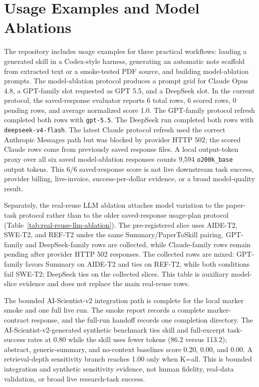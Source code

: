 \section{Usage Examples and Model Ablations}

The repository includes usage examples for three practical workflows:
loading a generated skill in a Codex-style harness, generating an automatic
note scaffold from extracted text or a smoke-tested PDF source, and building
model-ablation prompts. The
model-ablation protocol produces a prompt grid for Claude Opus 4.8, a
GPT-family slot requested as GPT 5.5, and a DeepSeek slot. In the current
protocol, the saved-response evaluator reports 6 total rows, 6 scored rows, 0
pending rows, and average normalized score 1.0. The GPT-family protocol refresh
completed both rows with \texttt{gpt-5.5}. The DeepSeek run completed both rows
with \texttt{deepseek-v4-flash}. The latest Claude protocol refresh used the
correct Anthropic Messages path but was blocked by provider HTTP 502; the
scored Claude rows come from previously saved response files. A local
output-token proxy over all six saved model-ablation responses counts 9,594
\texttt{o200k\_base} output tokens. This 6/6 saved-response score is not live
downstream task success, provider billing, live-invoice, success-per-dollar
evidence, or a broad model-quality result.

Separately, the real-reuse LLM ablation attaches model variation to the
paper-task protocol rather than to the older saved-response usage-plan
protocol (Table~\ref{tab:real-reuse-llm-ablation}). The pre-registered slice
uses AIDE-T2, SWE-T2, and REF-T2 under the same Summary/PaperToSkill pairing.
GPT-family and DeepSeek-family rows are collected, while Claude-family rows
remain pending after provider HTTP 502 responses. The collected rows are mixed:
GPT-family favors Summary on AIDE-T2 and ties on REF-T2, while both conditions
fail SWE-T2; DeepSeek ties on the collected slices. This table is auxiliary
model-slice evidence and does not replace the main real-reuse rows.

The bounded AI-Scientist-v2 integration path is complete for the local marker
smoke and one full live run. The smoke report records a complete marker-contract
response, and the full-run handoff records one completion directory. The
AI-Scientist-v2-generated synthetic benchmark ties skill and full-excerpt
task-success rates at 0.80 while the skill uses fewer tokens (86.2 versus
113.2); abstract, generic-summary, and no-context baselines score 0.20, 0.00,
and 0.00. A retrieval-depth sensitivity branch reaches 1.00 only when K=all.
This is bounded integration and synthetic sensitivity evidence, not human
fidelity, real-data validation, or broad live research-task success.

